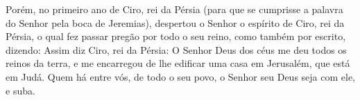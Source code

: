 Porém, no primeiro ano de Ciro, rei da Pérsia (para que se
cumprisse a palavra do Senhor pela boca de Jeremias), despertou o
Senhor o espírito de Ciro, rei da Pérsia, o qual fez passar pregão
por todo o seu reino, como também por escrito, dizendo: Assim
diz Ciro, rei da Pérsia: O Senhor Deus dos céus me deu todos os
reinos da terra, e me encarregou de lhe edificar uma casa em
Jerusalém, que está em Judá. Quem há entre vós, de todo o seu povo,
o Senhor seu Deus seja com ele, e suba.


